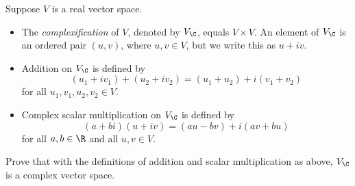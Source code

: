 \begin{exercise}
Suppose $V$ is a real vector space.
\begin{itemize}
\item The \emph{complexification} of $V$, denoted by $V_{\C}$, equals
  $V\times V$. An element of $V_{\C}$ is an ordered pair $(u,v)$, where
  $u,v\in V$, but we write this as $u+iv$.
\item Addition on $V_{\C}$ is defined by
  \[ (u_1+iv_1)+(u_2+iv_2) = (u_1+u_2)+i(v_1+v_2) \]
  for all $u_1,v_1,u_2,v_2\in V$.
\item Complex scalar multiplication on $V_{\C}$ is defined by
  \[ (a+bi)(u+iv) = (au-bv)+i(av+bu) \]
  for all $a,b\in\R$ and all $u,v\in V$.
\end{itemize}
Prove that with the definitions of addition and scalar multiplication as
above, $V_{\C}$ is a complex vector space.
\end{exercise}
